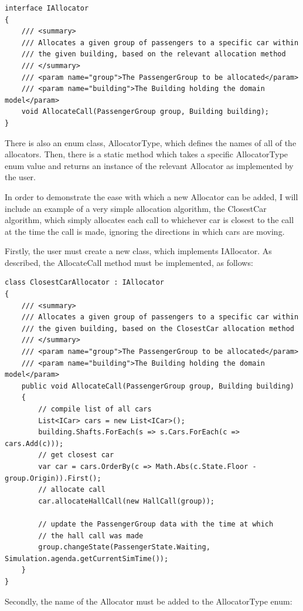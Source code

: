 \documentclass{UoYCSproject}
\begin{document}
\lstset{language=[Sharp]C, basicstyle=\ttfamily\tiny, breaklines=true, breakatwhitespace=true }
\begin{lstlisting}
interface IAllocator
{
	/// <summary>
	/// Allocates a given group of passengers to a specific car within
	/// the given building, based on the relevant allocation method
	/// </summary>
	/// <param name="group">The PassengerGroup to be allocated</param>
	/// <param name="building">The Building holding the domain model</param>
	void AllocateCall(PassengerGroup group, Building building);
}
\end{lstlisting}

There is also an enum class, AllocatorType, which defines the names of all of the allocators.  Then, there is a static method which takes a specific AllocatorType enum value and returns an instance of the relevant Allocator as implemented by the user.

In order to demonstrate the ease with which a new Allocator can be added, I will include an example of a very simple allocation algorithm, the ClosestCar algorithm, which simply allocates each call to whichever car is closest to the call at the time the call is made, ignoring the directions in which cars are moving.

Firstly, the user must create a new class, which implements IAllocator.  As described, the AllocateCall method must be implemented, as follows:

\begin{lstlisting}
class ClosestCarAllocator : IAllocator
{
	/// <summary>
	/// Allocates a given group of passengers to a specific car within
	/// the given building, based on the ClosestCar allocation method
	/// </summary>
	/// <param name="group">The PassengerGroup to be allocated</param>
	/// <param name="building">The Building holding the domain model</param>
	public void AllocateCall(PassengerGroup group, Building building)
	{
		// compile list of all cars
		List<ICar> cars = new List<ICar>();
		building.Shafts.ForEach(s => s.Cars.ForEach(c => cars.Add(c)));
		// get closest car
		var car = cars.OrderBy(c => Math.Abs(c.State.Floor - group.Origin)).First();
		// allocate call
		car.allocateHallCall(new HallCall(group));
	
		// update the PassengerGroup data with the time at which
		// the hall call was made
		group.changeState(PassengerState.Waiting, Simulation.agenda.getCurrentSimTime());
	}
}
\end{lstlisting}

Secondly, the name of the Allocator must be added to the AllocatorType enum:
\end{document}
